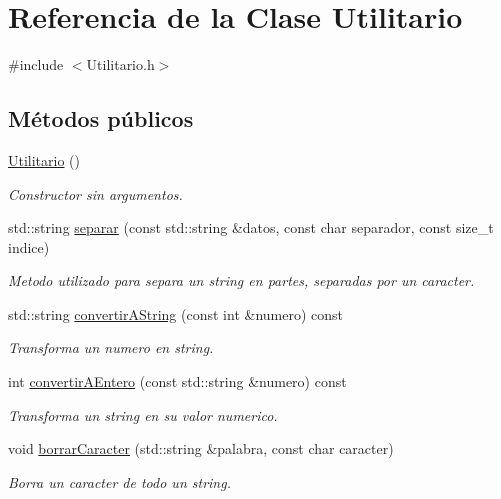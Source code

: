 \hypertarget{classUtilitario}{\section{\-Referencia de la \-Clase \-Utilitario}
\label{classUtilitario}
}


{\ttfamily \#include $<$\-Utilitario.\-h$>$}

\subsection*{\-Métodos públicos}
\begin{DoxyCompactItemize}
\item 
\hypertarget{classUtilitario_ad3b4aba2f9b704ed60663fee17668ae8}{\hyperlink{classUtilitario_ad3b4aba2f9b704ed60663fee17668ae8}{\-Utilitario} ()}\label{classUtilitario_ad3b4aba2f9b704ed60663fee17668ae8}

\begin{DoxyCompactList}\small\item\em \-Constructor sin argumentos. \end{DoxyCompactList}\item 
std\-::string \hyperlink{classUtilitario_acbe7fdb159f88101343affb15e5fda9b}{separar} (const std\-::string \&datos, const char separador, const size\-\_\-t indice)
\begin{DoxyCompactList}\small\item\em \-Metodo utilizado para separa un string en partes, separadas por un caracter. \end{DoxyCompactList}\item 
std\-::string \hyperlink{classUtilitario_adba909993e81d32022e90ada706bea63}{convertir\-A\-String} (const int \&numero) const 
\begin{DoxyCompactList}\small\item\em \-Transforma un numero en string. \end{DoxyCompactList}\item 
int \hyperlink{classUtilitario_a9d4503d48e1922d8290247d5e44eaab5}{convertir\-A\-Entero} (const std\-::string \&numero) const 
\begin{DoxyCompactList}\small\item\em \-Transforma un string en su valor numerico. \end{DoxyCompactList}\item 
void \hyperlink{classUtilitario_ad59453fdfc7947874f4551310ee6a0dc}{borrar\-Caracter} (std\-::string \&palabra, const char caracter)
\begin{DoxyCompactList}\small\item\em \-Borra un caracter de todo un string. \end{DoxyCompactList}\end{DoxyCompactItemize}


